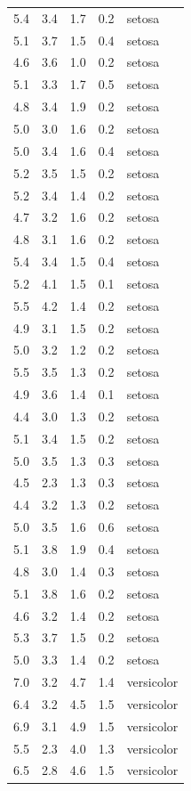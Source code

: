 \documentclass[
  letterpaper,
  DIV=11,
  numbers=noendperiod]{scrreprt}
\begin{document}
\begin{longtable}[]{@{}rrrrl@{}}
5.4 & 3.4 & 1.7 & 0.2 & setosa \\
5.1 & 3.7 & 1.5 & 0.4 & setosa \\
4.6 & 3.6 & 1.0 & 0.2 & setosa \\
5.1 & 3.3 & 1.7 & 0.5 & setosa \\
4.8 & 3.4 & 1.9 & 0.2 & setosa \\
5.0 & 3.0 & 1.6 & 0.2 & setosa \\
5.0 & 3.4 & 1.6 & 0.4 & setosa \\
5.2 & 3.5 & 1.5 & 0.2 & setosa \\
5.2 & 3.4 & 1.4 & 0.2 & setosa \\
4.7 & 3.2 & 1.6 & 0.2 & setosa \\
4.8 & 3.1 & 1.6 & 0.2 & setosa \\
5.4 & 3.4 & 1.5 & 0.4 & setosa \\
5.2 & 4.1 & 1.5 & 0.1 & setosa \\
5.5 & 4.2 & 1.4 & 0.2 & setosa \\
4.9 & 3.1 & 1.5 & 0.2 & setosa \\
5.0 & 3.2 & 1.2 & 0.2 & setosa \\
5.5 & 3.5 & 1.3 & 0.2 & setosa \\
4.9 & 3.6 & 1.4 & 0.1 & setosa \\
4.4 & 3.0 & 1.3 & 0.2 & setosa \\
5.1 & 3.4 & 1.5 & 0.2 & setosa \\
5.0 & 3.5 & 1.3 & 0.3 & setosa \\
4.5 & 2.3 & 1.3 & 0.3 & setosa \\
4.4 & 3.2 & 1.3 & 0.2 & setosa \\
5.0 & 3.5 & 1.6 & 0.6 & setosa \\
5.1 & 3.8 & 1.9 & 0.4 & setosa \\
4.8 & 3.0 & 1.4 & 0.3 & setosa \\
5.1 & 3.8 & 1.6 & 0.2 & setosa \\
4.6 & 3.2 & 1.4 & 0.2 & setosa \\
5.3 & 3.7 & 1.5 & 0.2 & setosa \\
5.0 & 3.3 & 1.4 & 0.2 & setosa \\
7.0 & 3.2 & 4.7 & 1.4 & versicolor \\
6.4 & 3.2 & 4.5 & 1.5 & versicolor \\
6.9 & 3.1 & 4.9 & 1.5 & versicolor \\
5.5 & 2.3 & 4.0 & 1.3 & versicolor \\
6.5 & 2.8 & 4.6 & 1.5 & versicolor \\

\end{longtable}
\end{document}

